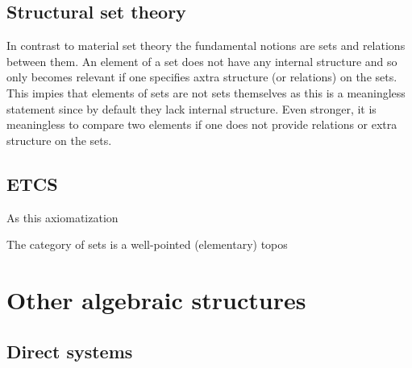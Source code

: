 \subsection{Structural set theory}

	In contrast to material set theory the fundamental notions are sets and relations between them. An element of a set does not have any internal structure and so only becomes relevant if one specifies axtra structure (or relations) on the sets. This impies that elements of sets are not sets themselves as this is a meaningless statement since by default they lack internal structure. Even stronger, it is meaningless to compare two elements if one does not provide relations or extra structure on the sets.

\subsection{ETCS}

	As this axiomatization 


	\begin{axiom}
		The category of sets is a well-pointed (elementary) topos 
	\end{axiom}




\section{Other algebraic structures}
\subsection{Direct systems}


